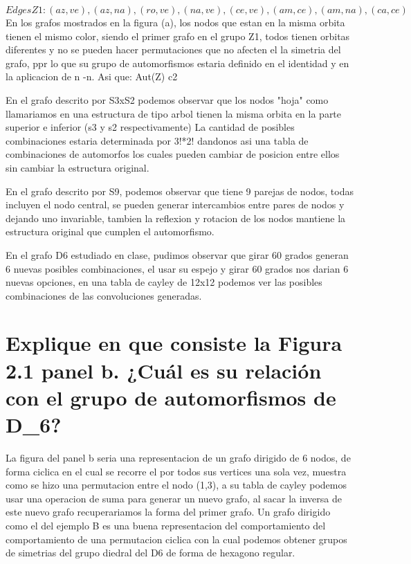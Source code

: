 \documentclass{article}
\begin{document}
 
\begin{equation}
Edges Z1:{(az , ve),(az , na),(ro , ve),(na , ve),(ce , ve),(am , ce),(am , na),(ca , ce)}
\end{equation}
En los grafos mostrados en la figura (a), los nodos que estan en la misma orbita tienen el mismo color, siendo el primer grafo en el grupo Z1, todos tienen orbitas diferentes y no se pueden hacer permutaciones que no afecten el la simetria del grafo, ppr lo que su grupo de automorfismos estaria definido en el identidad y en la aplicacion de n \rightarrow -n. Asi que: Aut(Z) \cong c2


En el grafo descrito por S3xS2 podemos observar que los nodos "hoja" como llamariamos en una estructura de tipo arbol tienen la misma orbita en la parte superior e inferior (s3 y s2 respectivamente) La cantidad de posibles combinaciones estaria determinada por 3!*2! dandonos asi una tabla de combinaciones de automorfos los cuales pueden cambiar de posicion entre ellos sin cambiar la estructura original.

En el grafo descrito por S9, podemos observar que tiene 9 parejas de nodos, todas incluyen el nodo central, se pueden generar intercambios entre pares de nodos y dejando uno invariable, tambien la reflexion y rotacion de los nodos mantiene la estructura original que cumplen el automorfismo.

En el grafo D6 estudiado en clase, pudimos observar que girar 60 grados generan 6 nuevas posibles combinaciones, el usar su espejo y girar 60 grados nos darian 6 nuevas opciones, en una tabla de cayley de 12x12 podemos ver las posibles combinaciones de las convoluciones generadas.





\section{Explique en que consiste la Figura 2.1 panel b. ¿Cuál es su relación con el grupo de automorfismos de D_6?}

La figura del panel b seria una representacion de un grafo dirigido de 6 nodos, de forma ciclica en el cual se recorre el por todos sus vertices una sola vez, muestra como se hizo una permutacion entre el nodo (1,3), a su tabla de cayley podemos usar una operacion de suma para generar un nuevo grafo, al sacar la inversa de este nuevo grafo recuperariamos la forma del primer grafo. Un grafo dirigido como el del ejemplo B es una buena representacion del comportamiento del comportamiento de una permutacion ciclica con la cual podemos obtener grupos de simetrias del grupo diedral del D6 de forma de hexagono regular.
\end{document}
